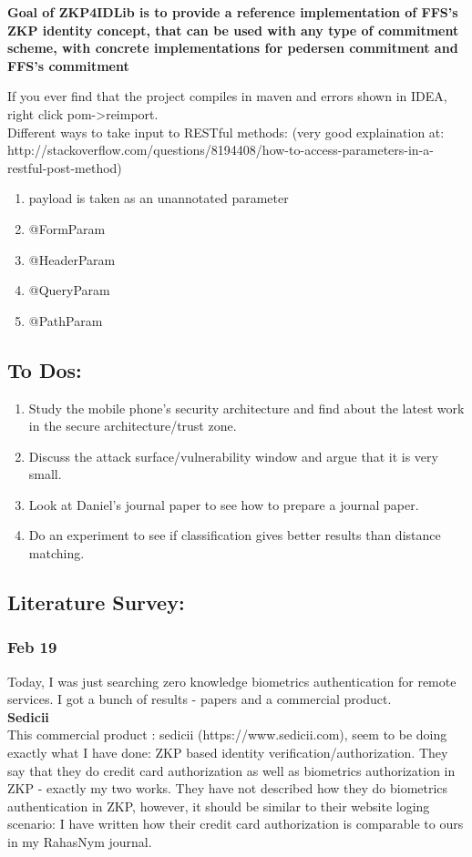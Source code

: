 \documentclass[11pt]{article}
\begin{document}
\textbf{Goal of ZKP4IDLib is to provide a reference implementation of FFS's ZKP identity concept, that can be used with
        any type of commitment scheme, with concrete implementations for pedersen commitment and FFS's commitment}

If you ever find that the project compiles in maven and errors shown in IDEA, right click pom->reimport.\\

Different ways to take input to RESTful methods: (very good explaination at: 
http://stackoverflow.com/questions/8194408/how-to-access-parameters-in-a-restful-post-method)
\begin{enumerate}
 \item payload is taken as an unannotated parameter
 \item @FormParam
 \item @HeaderParam
 \item @QueryParam
 \item @PathParam
\end{enumerate}



\pagebreak
\subsection*{To Dos:}
\begin{enumerate}
 \item Study the mobile phone's security architecture and find about the latest work in the secure architecture/trust zone.
 \item Discuss the attack surface/vulnerability window and argue that it is very small.
 \item Look at Daniel's journal paper to see how to prepare a journal paper.
 \item Do an experiment to see if classification gives better results than distance matching.
\end{enumerate}

\subsection*{Literature Survey:}
\subsubsection*{Feb 19}
Today, I was just searching zero knowledge biometrics authentication for remote services. I got a bunch of results - papers and a commercial
product.\\
\textbf{Sedicii}\\
This commercial product : sedicii (https://www.sedicii.com), seem to be doing exactly what I have done: ZKP based identity verification/authorization.
They say that they do credit card authorization as well as biometrics authorization in ZKP - exactly my two works.
They have not described how they do biometrics authentication in ZKP, however, it should be similar to their website loging scenario:
I have written how their credit card authorization is comparable to ours in my RahasNym journal.
\end{document}
